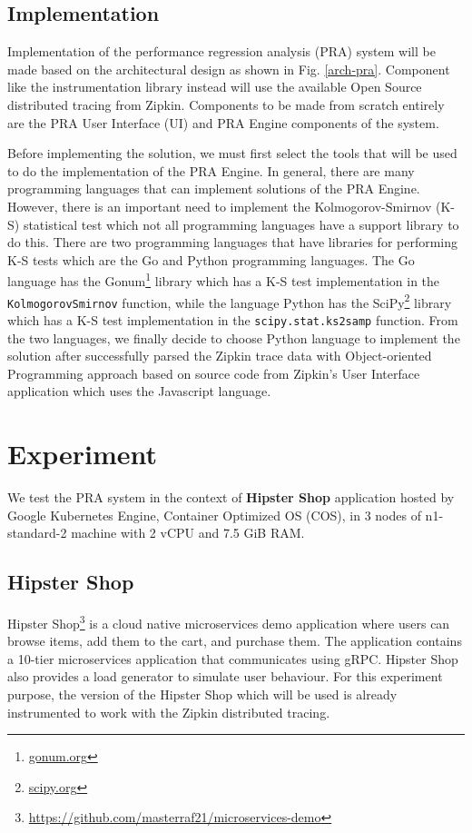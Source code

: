 \documentclass[conference]{configs/IEEEtran}
\begin{document}
\subsection{Implementation}
Implementation of the performance regression analysis (PRA) system will be made based on the architectural design as shown in Fig. \ref{arch-pra}. Component
like the instrumentation library instead will use the available
Open Source distributed tracing from Zipkin. Components to be made from scratch entirely are the PRA User Interface (UI) and PRA Engine components of the system.

Before implementing the solution, we  must first
select the tools that will be used to do the implementation of the PRA Engine. In general, there are many programming languages that can implement solutions of the PRA Engine. However, there is an important need to implement the Kolmogorov-Smirnov (K-S) statistical test which not all programming languages have a support library to do this. There are two programming languages that have libraries for performing K-S tests
which are the Go and Python programming languages. The Go language has the Gonum\footnote{\url{gonum.org}} library which
has a K-S test implementation in the \texttt{KolmogorovSmirnov} function, while the language
Python has the SciPy\footnote{\url{scipy.org}} library which has a K-S test implementation in the \texttt{scipy.stat.ks\textunderscore 2samp} function. From the two languages, we finally decide to choose Python language to implement the solution after successfully parsed the Zipkin trace data with Object-oriented Programming approach based on source code from Zipkin's User Interface application which uses the Javascript language.

\section{Experiment}
We test the PRA system in the context of \textbf{Hipster Shop} application hosted by Google Kubernetes Engine, Container Optimized OS (COS), in 3 nodes of n1-standard-2 machine with 2 vCPU and 7.5 GiB RAM.

\subsection{Hipster Shop}
Hipster Shop\footnote{\url{https://github.com/masterraf21/microservices-demo}} is a cloud native microservices demo application
where users can browse items, add them to the
cart, and purchase them. The application contains a 10-tier
microservices application that communicates using gRPC.
Hipster Shop also provides a load generator to simulate user
behaviour. For this experiment purpose, the version of the Hipster Shop which will be used is already instrumented to work with the Zipkin distributed tracing.
\end{document}
